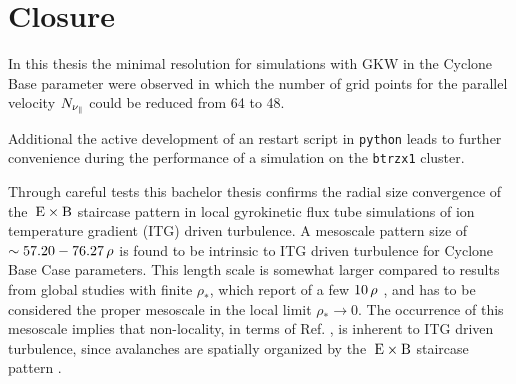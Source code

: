
\chapter{Closure}
\label{chap:close}

\thispagestyle{empty}
\newpage

In this thesis the minimal resolution for simulations with GKW in the Cyclone Base parameter were observed in which the number of grid points for the parallel velocity $N_{\nu_\parallel}$ could be reduced from 64 to 48. \bigskip

Additional the active development of an restart script in \texttt{python} leads to further convenience during the performance of a simulation on the \texttt{btrzx1} cluster. \bigskip

Through careful tests this bachelor thesis confirms the radial size convergence of the $\mathrm{\:E}\times\mathrm{B}$ staircase pattern in local gyrokinetic flux tube simulations of ion temperature gradient (ITG) driven turbulence.
A mesoscale pattern size of $\sim 57.20 - 76.27\,\rho$ is found to be intrinsic to ITG driven turbulence for Cyclone Base Case parameters.
This length scale is somewhat larger compared to results from global studies with finite $\rho_\ast$, which report of a few $10\,\rho$ \cite{Pradalier2010}, and has to be considered the proper mesoscale in the local limit $\rho_\ast \rightarrow 0$.  
The occurrence of this mesoscale implies that non-locality, in terms of Ref. , is inherent to ITG driven turbulence, since avalanches are spatially organized by the $\mathrm{\:E}\times\mathrm{B}$ staircase pattern \cite{McMillan2009, Pradalier2010, Rath2016, Peeters2016}. 